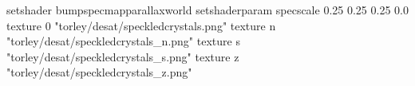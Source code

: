 setshader bumpspecmapparallaxworld
setshaderparam specscale 0.25 0.25 0.25 0.0
texture 0 "torley/desat/speckledcrystals.png"
texture n "torley/desat/speckledcrystals_n.png"
texture s "torley/desat/speckledcrystals_s.png"
texture z "torley/desat/speckledcrystals_z.png"

